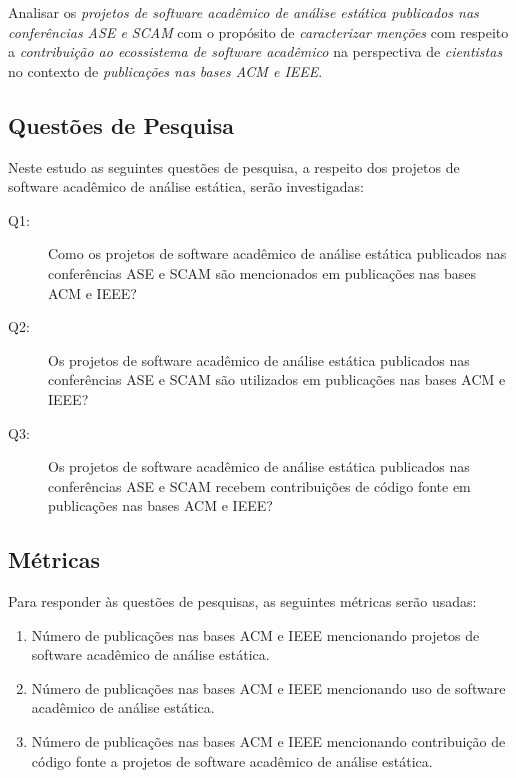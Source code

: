 Analisar os \textit{projetos de software acadêmico de análise estática publicados nas conferências ASE e SCAM}
com o propósito de \textit{caracterizar menções}
com respeito a \textit{contribuição ao ecossistema de software acadêmico}
na perspectiva de \textit{cientistas}
no contexto de \textit{publicações nas bases ACM e IEEE}.

\subsection{Questões de Pesquisa}

Neste estudo as seguintes questões de pesquisa, a respeito dos projetos de
software acadêmico de análise estática, serão investigadas:

\newcommand{\EstudoDoisQuestaoUm}{
  Como os projetos de software acadêmico de análise estática publicados nas
  conferências ASE e SCAM são mencionados em publicações nas bases ACM e IEEE?
}
\newcommand{\EstudoDoisQuestaoDois}{
   Os projetos de software acadêmico de análise estática publicados nas
   conferências ASE e SCAM são utilizados em publicações nas bases ACM e IEEE?
}
\newcommand{\EstudoDoisQuestaoTres}{
  Os projetos de software acadêmico de análise estática publicados nas
  conferências ASE e SCAM recebem contribuições de código fonte em publicações
  nas bases ACM e IEEE?
}

\begin{description}
  \item [Q1:] \EstudoDoisQuestaoUm
  \item [Q2:] \EstudoDoisQuestaoDois
  \item [Q3:] \EstudoDoisQuestaoTres
\end{description}

\subsection{Métricas}

Para responder às questões de pesquisas, as seguintes métricas serão usadas:

\begin{enumerate}
  \item Número de publicações nas bases ACM e IEEE mencionando projetos de
    software acadêmico de análise estática.
  \item Número de publicações nas bases ACM e IEEE mencionando uso de
    software acadêmico de análise estática.
  \item Número de publicações nas bases ACM e IEEE mencionando contribuição de
    código fonte a projetos de software acadêmico de análise estática.
\end{enumerate}

